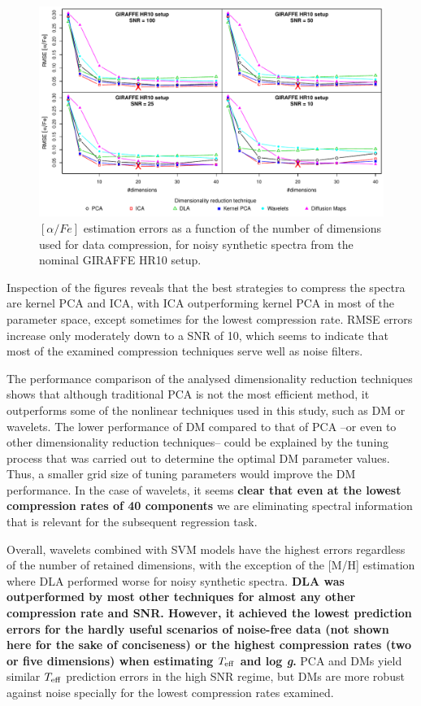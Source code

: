 \documentclass[a4paper,fleqn,usenatbib]{mnras}
\begin{document}
{{{\begin{figure}
\centering\includegraphics[width=\textwidth]{flamesHR10_AlFe_BestSVM_N-RMSE_test.pdf}
\caption{$\left[ \alpha/Fe \right]$ estimation errors as a function of the number of
  dimensions used for data compression, for noisy synthetic
  spectra from the nominal GIRAFFE HR10 setup.}
\label{fig:07}
\end{figure}

Inspection of the figures reveals that the best strategies to compress
the spectra are kernel PCA and ICA, with ICA outperforming kernel PCA
in most of the parameter space, except sometimes for the lowest
compression rate. RMSE errors increase only moderately down to a SNR
of 10, which seems to indicate that most of the examined compression
techniques serve well as noise filters.

The performance comparison of the analysed dimensionality reduction
techniques shows that although traditional PCA is not the most
efficient method, it outperforms some of the nonlinear techniques used
in this study, such as DM or wavelets. %
The lower performance of DM compared to that of PCA --or even to other 
dimensionality reduction techniques-- could be explained by the 
tuning process that was carried out to determine the optimal DM 
parameter values. Thus, a smaller grid size of tuning parameters 
would improve the DM performance.
In the case of wavelets, it seems {\bf clear that even at the lowest 
compression rates of 40 components} we are eliminating
spectral information that is relevant for the subsequent regression task. 

Overall, wavelets combined with SVM models have the highest errors
regardless of the number of retained dimensions, with the exception of
the [M/H] estimation where DLA performed worse for noisy synthetic
spectra. {\bf DLA was outperformed by most other techniques for almost 
any other compression rate and SNR. However, it achieved the lowest 
prediction errors for the hardly useful scenarios of noise-free data 
(not shown here for the sake of conciseness) or the highest compression 
rates (two or five dimensions) when estimating $T_{\rm eff}$ and 
log \textit{g}.} PCA and DMs yield similar $T_{\rm eff}$ prediction
errors in the high SNR regime, but DMs are more robust against noise
specially for the lowest compression rates examined.

}}}
\end{document}
